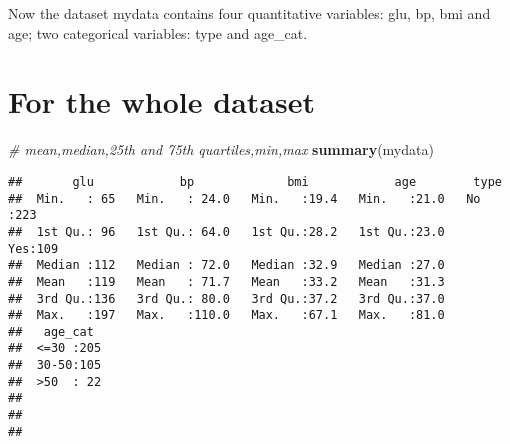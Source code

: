 \documentclass[]{book}
\newenvironment{Shaded}{\begin{snugshade}}{\end{snugshade}}
\newcommand{\KeywordTok}[1]{\textcolor[rgb]{0.13,0.29,0.53}{\textbf{#1}}}
\newcommand{\DataTypeTok}[1]{\textcolor[rgb]{0.13,0.29,0.53}{#1}}
\newcommand{\DecValTok}[1]{\textcolor[rgb]{0.00,0.00,0.81}{#1}}
\newcommand{\StringTok}[1]{\textcolor[rgb]{0.31,0.60,0.02}{#1}}
\newcommand{\CommentTok}[1]{\textcolor[rgb]{0.56,0.35,0.01}{\textit{#1}}}
\newcommand{\OperatorTok}[1]{\textcolor[rgb]{0.81,0.36,0.00}{\textbf{#1}}}
\newcommand{\NormalTok}[1]{#1}
\theoremstyle{definition}
\theoremstyle{definition}
\theoremstyle{definition}
\theoremstyle{remark}
\begin{document}
\begin{Shaded}
\end{Shaded}

Now the dataset mydata contains four quantitative variables: glu, bp,
bmi and age; two categorical variables: type and age\_cat.

\section{For the whole dataset}\label{for-the-whole-dataset}

\begin{Shaded}
\begin{Highlighting}[]
\CommentTok{# mean,median,25th and 75th quartiles,min,max}
\KeywordTok{summary}\NormalTok{(mydata)}
\end{Highlighting}
\end{Shaded}

\begin{verbatim}
##       glu            bp             bmi            age        type    
##  Min.   : 65   Min.   : 24.0   Min.   :19.4   Min.   :21.0   No :223  
##  1st Qu.: 96   1st Qu.: 64.0   1st Qu.:28.2   1st Qu.:23.0   Yes:109  
##  Median :112   Median : 72.0   Median :32.9   Median :27.0            
##  Mean   :119   Mean   : 71.7   Mean   :33.2   Mean   :31.3            
##  3rd Qu.:136   3rd Qu.: 80.0   3rd Qu.:37.2   3rd Qu.:37.0            
##  Max.   :197   Max.   :110.0   Max.   :67.1   Max.   :81.0            
##   age_cat   
##  <=30 :205  
##  30-50:105  
##  >50  : 22  
##             
##             
## 
\end{verbatim}
\end{document}

